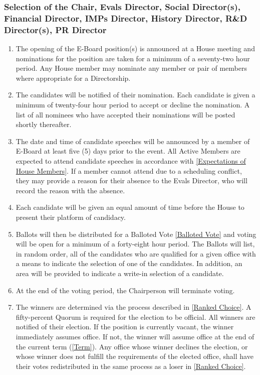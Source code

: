 \documentclass{article}
\begin{document}
\subsubsection{Selection of the Chair, Evals Director, Social Director(s), Financial Director, IMPs Director, History Director,  R\&D Director(s), PR Director}
\begin{enumerate}
	\item The opening of the E-Board position(s) is announced at a House meeting and nominations for the position are taken for a minimum of a seventy-two hour period.
		Any House member may nominate any member or pair of members where appropriate for a Directorship.
	\item The candidates will be notified of their nomination.
		Each candidate is given a minimum of twenty-four hour period to accept or decline the nomination.
		A list of all nominees who have accepted their nominations will be posted shortly thereafter.
	\item The date and time of candidate speeches will be announced by a member of E-Board at least five (5) days prior to the event. 
		All Active Members are expected to attend candidate speeches in accordance with \ref{Expectations of House Members}.
		If a member cannot attend due to a scheduling conflict, they may provide a reason for their absence to the Evals Director, who will record the reason with the absence.
	\item Each candidate will be given an equal amount of time before the House to present their platform of candidacy.
	\item Ballots will then be distributed for a Balloted Vote \ref{Balloted Vote} and voting will be open for a minimum of a forty-eight hour period.
		The Ballots will list, in random order, all of the candidates who are qualified for a given office with a means to indicate the selection of one of the candidates.
		In addition, an area will be provided to indicate a write-in selection of a candidate.
	\item At the end of the voting period, the Chairperson will terminate voting.
	\item The winners are determined via the process described in \ref{Ranked Choice}.
		A fifty-percent Quorum is required for the election to be official.
		All winners are notified of their election.
		If the position is currently vacant, the winner immediately assumes office.
		If not, the winner will assume office at the end of the current term (\ref{Term}).
		Any office whose winner declines the election, or whose winner does not fulfill the requirements of the elected office, shall have their votes redistributed in the same process as a loser in \ref{Ranked Choice}.
\end{enumerate}
\end{document}
